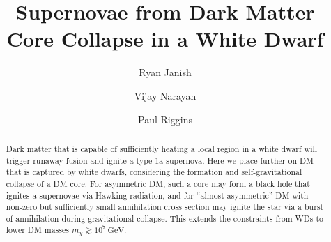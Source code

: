 \documentclass[preprintnumbers,amsmath,amssymb,prd,superscriptaddress]{revtex4}
\begin{document}

\title{Supernovae from Dark Matter Core Collapse in a White Dwarf}

\author{Ryan Janish}

\author{Vijay Narayan}

\author{Paul Riggins}

\begin{abstract}

Dark matter that is capable of sufficiently heating a local region in a white dwarf will trigger runaway fusion and ignite a type 1a supernova.
Here we place further on DM that is captured by white dwarfs, considering the formation and self-gravitational collapse of a DM core.
For asymmetric DM, such a core may form a black hole that ignites a supernovae via Hawking radiation, and for ``almost asymmetric'' DM with non-zero but sufficiently small annihilation cross section may ignite the star via a burst of annihilation during gravitational collapse. 
This extends the constraints from WDs to lower DM masses $m_\chi \gtrsim 10^{7}~\text{GeV}$. 

\end{abstract}

\maketitle
\end{document}
